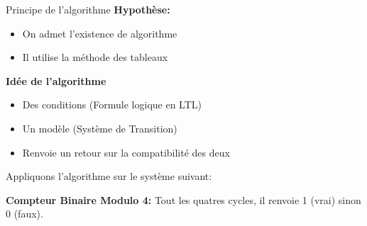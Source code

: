 \documentclass{beamer}
\theoremstyle{definition}
\begin{document}
\begin{frame}{Principe de l'algorithme}
    \textbf{Hypothèse:}
    \begin{itemize}
        \item On admet l'existence de algorithme
        \item Il utilise la méthode des tableaux
    \end{itemize}
    \pause
    \vspace{10px}
    \textbf{Idée de l'algorithme}
    \begin{itemize}
        \item Des conditions (Formule logique en LTL)
        \item Un modèle (Système de Transition)
        \item Renvoie un retour sur la compatibilité des deux
    \end{itemize}
    \vspace{10px}
    Appliquons l'algorithme sur le système suivant:
    
    \textbf{Compteur Binaire Modulo 4: } Tout les quatres cycles, il renvoie 1 (vrai) sinon 0 (faux).
\end{frame}
\end{document}
